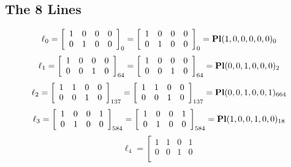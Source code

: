 \documentclass{article}
\begin{document}
{\subsection*{The 8 Lines}
$$
\ell_{0} = 
\left[
\begin{array}{*{4}{r}}
1 & 0 & 0 & 0\\
0 & 1 & 0 & 0\\
\end{array}
\right]
_{0}
=
\left[
\begin{array}{*{4}c}
1  & 0  & 0  & 0\\
0  & 1  & 0  & 0\\
\end{array}
\right]_{0}
={\rm\bf Pl}(1,0,0,0,0,0 )_{0}$$
$$
\ell_{1} = 
\left[
\begin{array}{*{4}{r}}
1 & 0 & 0 & 0\\
0 & 0 & 1 & 0\\
\end{array}
\right]
_{64}
=
\left[
\begin{array}{*{4}c}
1  & 0  & 0  & 0\\
0  & 0  & 1  & 0\\
\end{array}
\right]_{64}
={\rm\bf Pl}(0,0,1,0,0,0 )_{2}$$
$$
\ell_{2} = 
\left[
\begin{array}{*{4}{r}}
1 & 1 & 0 & 0\\
0 & 0 & 1 & 0\\
\end{array}
\right]
_{137}
=
\left[
\begin{array}{*{4}c}
1  & 1  & 0  & 0\\
0  & 0  & 1  & 0\\
\end{array}
\right]_{137}
={\rm\bf Pl}(0,0,1,0,0,1 )_{664}$$
$$
\ell_{3} = 
\left[
\begin{array}{*{4}{r}}
1 & 0 & 0 & 1\\
0 & 1 & 0 & 0\\
\end{array}
\right]
_{584}
=
\left[
\begin{array}{*{4}c}
1  & 0  & 0  & 1\\
0  & 1  & 0  & 0\\
\end{array}
\right]_{584}
={\rm\bf Pl}(1,0,0,1,0,0 )_{18}$$
$$
\ell_{4} = 
\left[
\begin{array}{*{4}{r}}
1 & 1 & 0 & 1\\
0 & 0 & 1 & 0\\
\end{array}
$$}
\end{document}
